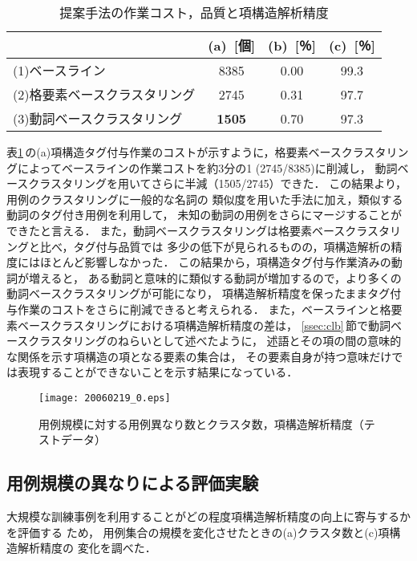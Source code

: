 \begin{table}[t]
\begin{center}
\caption{提案手法の作業コスト，品質と項構造解析精度}
\begin{tabular}{|l||c|c|c|} \hline
 & (a)\ [個] & (b)\ [％] & (c)\ [％] \\\hline\hline
{\footnotesize (1)ベースライン} & 8385 & 0.00 & 99.3 \\\hline
{\footnotesize (2)格要素ベースクラスタリング} & 2745 & 0.31 & 97.7 \\\hline
{\footnotesize (3)動詞ベースクラスタリング} & {\bf 1505} & 0.70 & 97.3 \\\hline
\end{tabular}
\label{tab:res1}
\end{center}
\end{table}


表\ref{tab:res1}\,の(a)項構造タグ付与作業のコストが示すように，格要素ベースクラスタリングによってベースラインの作業コストを約3分の1 (2745/8385)に削減し，
動詞ベースクラスタリングを用いてさらに半減（1505/2745）できた．
この結果より，用例のクラスタリングに一般的な名詞の
類似度を用いた手法に加え，類似する動詞のタグ付き用例を利用して，
未知の動詞の用例をさらにマージすることができたと言える．
また，動詞ベースクラスタリングは格要素ベースクラスタリングと比べ，タグ付与品質では
多少の低下が見られるものの，項構造解析の精度にはほとんど影響しなかった．
この結果から，項構造タグ付与作業済みの動詞が増えると，
ある動詞と意味的に類似する動詞が増加するので，より多くの動詞ベースクラスタリングが可能になり，
項構造解析精度を保ったままタグ付与作業のコストをさらに削減できると考えられる．
また，ベースラインと格要素ベースクラスタリングにおける項構造解析精度の差は，
\ref{ssec:clb}\,節で動詞ベースクラスタリングのねらいとして述べたように，
述語とその項の間の意味的な関係を示す項構造の項となる要素の集合は，
その要素自身が持つ意味だけでは表現することができないことを示す結果になっている．


\begin{figure}[t]
\begin{center}
         \texttt{[image: 20060219\_0.eps]}
    \caption{用例規模に対する用例異なり数とクラスタ数，項構造解析精度（テストデータ）}
    \label{fig:res2}
\end{center}
\end{figure}

\subsection{用例規模の異なりによる評価実験}
\label{ssec:eva2}
大規模な訓練事例を利用することがどの程度項構造解析精度の向上に寄与するかを評価する
ため，
用例集合の規模を変化させたときの(a)クラスタ数と(c)項構造解析精度の
変化を調べた．


